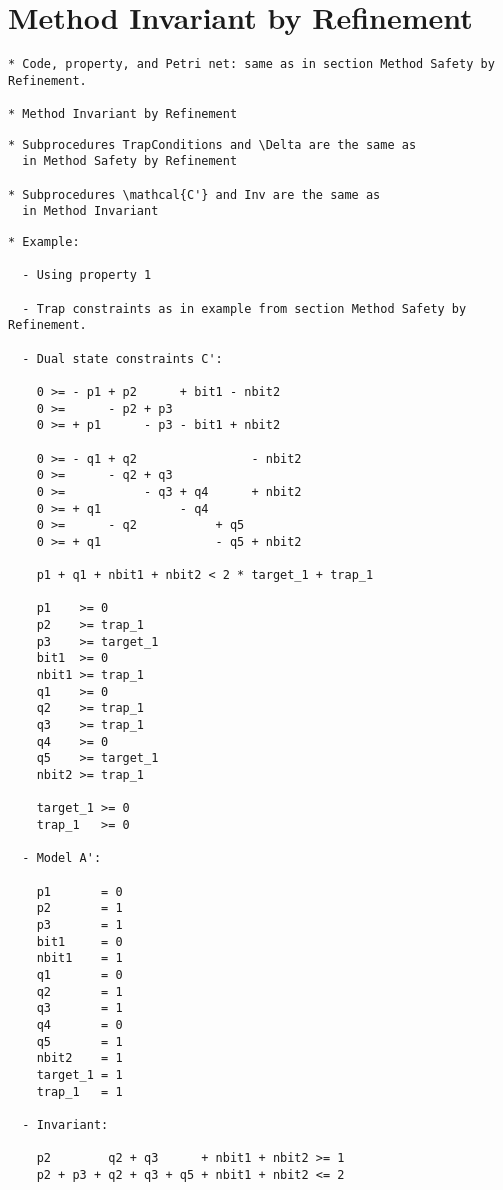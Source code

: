\section{Method Invariant by Refinement}

\begin{verbatim}
* Code, property, and Petri net: same as in section Method Safety by Refinement.

* Method Invariant by Refinement
\end{verbatim}




\begin{verbatim}
* Subprocedures TrapConditions and \Delta are the same as
  in Method Safety by Refinement

* Subprocedures \mathcal{C'} and Inv are the same as
  in Method Invariant
\end{verbatim}

\newpage

\begin{verbatim}
* Example:

  - Using property 1

  - Trap constraints as in example from section Method Safety by Refinement.
  
  - Dual state constraints C':

    0 >= - p1 + p2      + bit1 - nbit2
    0 >=      - p2 + p3
    0 >= + p1      - p3 - bit1 + nbit2

    0 >= - q1 + q2                - nbit2
    0 >=      - q2 + q3
    0 >=           - q3 + q4      + nbit2
    0 >= + q1           - q4
    0 >=      - q2           + q5
    0 >= + q1                - q5 + nbit2

    p1 + q1 + nbit1 + nbit2 < 2 * target_1 + trap_1

    p1    >= 0
    p2    >= trap_1
    p3    >= target_1
    bit1  >= 0
    nbit1 >= trap_1
    q1    >= 0
    q2    >= trap_1
    q3    >= trap_1
    q4    >= 0
    q5    >= target_1
    nbit2 >= trap_1

    target_1 >= 0
    trap_1   >= 0

  - Model A':

    p1       = 0
    p2       = 1
    p3       = 1
    bit1     = 0
    nbit1    = 1
    q1       = 0
    q2       = 1
    q3       = 1
    q4       = 0
    q5       = 1
    nbit2    = 1
    target_1 = 1
    trap_1   = 1
    
  - Invariant:

    p2        q2 + q3      + nbit1 + nbit2 >= 1
    p2 + p3 + q2 + q3 + q5 + nbit1 + nbit2 <= 2

\end{verbatim}
